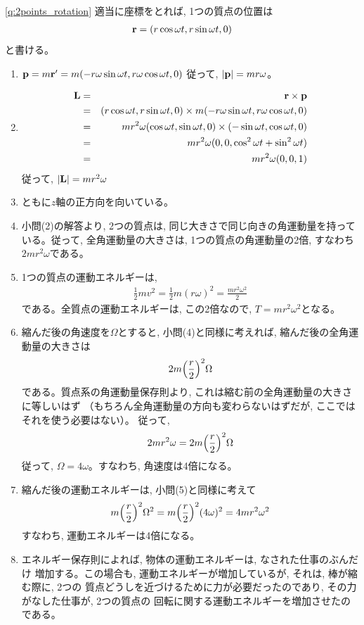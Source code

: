 \ref{q:2points_rotation}
適当に座標をとれば, 1つの質点の位置は
\begin{eqnarray*}
{\bf r}=(r\cos\omega t, r\sin\omega t, 0)
\end{eqnarray*}
と書ける。
\begin{enumerate}
\item ${\bf p}=m{\bf r}'=m(-r\omega\sin\omega t, r\omega\cos\omega t, 0)$
従って, $|{\bf p}|=mr\omega$。
\item
\begin{eqnarray*}
{\bf L}&=&{\bf r}\times{\bf p}\\
       &=&(r\cos\omega t, r\sin\omega t, 0)\times m(-r\omega\sin\omega t, r\omega\cos\omega t, 0)\\
       &=&mr^2\omega(\cos\omega t, \sin\omega t, 0)\times (-\sin\omega t, \cos\omega t, 0)\\
       &=&mr^2\omega(0, 0, \cos^2\omega t+\sin^2\omega t)\\
       &=&mr^2\omega(0, 0, 1)
\end{eqnarray*}
従って, $|{\bf L}|=mr^2\omega$
\item ともに$z$軸の正方向を向いている。
\item 小問(2)の解答より, 2つの質点は, 同じ大きさで同じ向きの角運動量を持っている。従って, 
全角運動量の大きさは, 1つの質点の角運動量の2倍, すなわち$2mr^2\omega$である。
\item 1つの質点の運動エネルギーは, 
\begin{eqnarray*}\frac{1}{2}mv^2=\frac{1}{2}m(r\omega)^2=\frac{mr^2\omega^2}{2}\end{eqnarray*}
である。全質点の運動エネルギーは, この2倍なので, $T=mr^2\omega^2$となる。
\item 縮んだ後の角速度を$\Omega$とすると, 小問(4)と同様に考えれば, 
縮んだ後の全角運動量の大きさは
\begin{eqnarray*}2m\Bigl(\frac{r}{2}\Bigr)^2\Omega\end{eqnarray*}
である。質点系の角運動量保存則より, これは縮む前の全角運動量の大きさに等しいはず
（もちろん全角運動量の方向も変わらないはずだが, ここではそれを使う必要はない）。
従って, 
\begin{eqnarray*}2mr^2\omega=2m\Bigl(\frac{r}{2}\Bigr)^2\Omega\end{eqnarray*}
従って, $\Omega=4\omega$。すなわち, 角速度は4倍になる。
\item 縮んだ後の運動エネルギーは, 小問(5)と同様に考えて
\begin{eqnarray*}
m\Bigl(\frac{r}{2}\Bigr)^2\Omega^2
=m\Bigl(\frac{r}{2}\Bigr)^2(4\omega)^2
=4mr^2\omega^2
\end{eqnarray*}
すなわち, 運動エネルギーは4倍になる。
\item エネルギー保存則によれば, 物体の運動エネルギーは, なされた仕事のぶんだけ
増加する。この場合も, 運動エネルギーが増加しているが, それは, 棒が縮む際に, 2つの
質点どうしを近づけるために力が必要だったのであり, その力がなした仕事が, 2つの質点の
回転に関する運動エネルギーを増加させたのである。
\end{enumerate}
\hv



